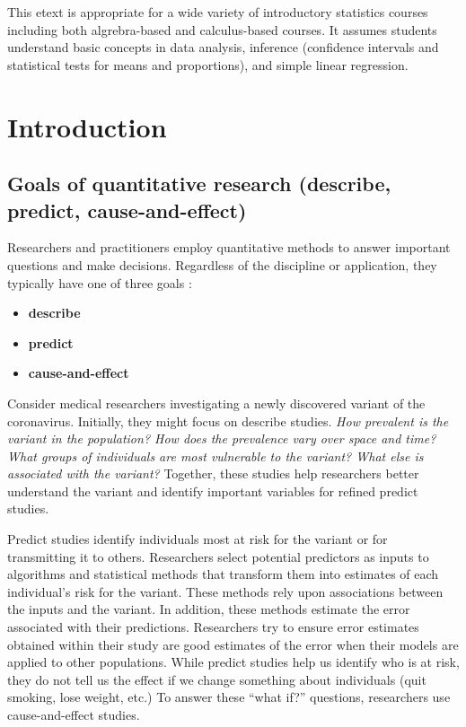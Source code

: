 \documentclass[]{book}
\begin{document}
This etext is appropriate for a wide variety of introductory statistics courses including both algrebra-based and calculus-based courses. It assumes students understand basic concepts in data analysis, inference (confidence intervals and statistical tests for means and proportions), and simple linear regression.

\hypertarget{introduction}{%
\chapter{Introduction}\label{introduction}}

\hypertarget{goals-of-quantitative-research-describe-predict-cause-and-effect}{%
\section{Goals of quantitative research (describe, predict, cause-and-effect)}\label{goals-of-quantitative-research-describe-predict-cause-and-effect}}

Researchers and practitioners employ quantitative methods to answer important questions and make decisions. Regardless of the discipline or application, they typically have one of three goals \citep{cozby2020methods}:

\begin{itemize}
\item
  \textbf{describe}
\item
  \textbf{predict}
\item
  \textbf{cause-and-effect}
\end{itemize}

Consider medical researchers investigating a newly discovered variant of the coronavirus. Initially, they might focus on describe studies. \emph{How prevalent is the variant in the population? How does the prevalence vary over space and time? What groups of individuals are most vulnerable to the variant? What else is associated with the variant?} Together, these studies help researchers better understand the variant and identify important variables for refined predict studies.

Predict studies identify individuals most at risk for the variant or for transmitting it to others. Researchers select potential predictors as inputs to algorithms and statistical methods that transform them into estimates of each individual's risk for the variant. These methods rely upon associations between the inputs and the variant. In addition, these methods estimate the error associated with their predictions. Researchers try to ensure error estimates obtained within their study are good estimates of the error when their models are applied to other populations. While predict studies help us identify who is at risk, they do not tell us the effect if we change something about individuals (quit smoking, lose weight, etc.) To answer these ``what if?'' questions, researchers use cause-and-effect studies.
\end{document}
